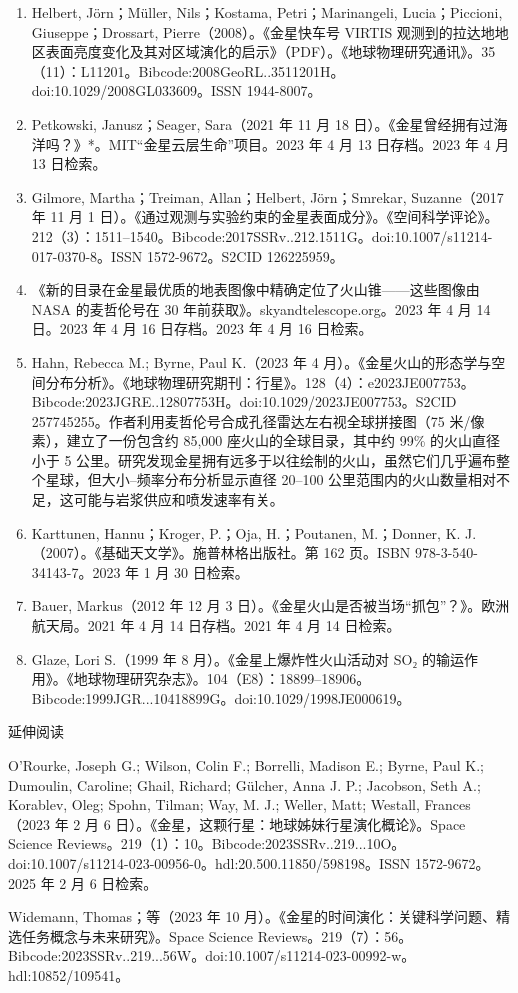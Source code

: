 \begin{enumerate}
\item Helbert, Jörn；Müller, Nils；Kostama, Petri；Marinangeli, Lucia；Piccioni, Giuseppe；Drossart, Pierre（2008）。《金星快车号 VIRTIS 观测到的拉达地地区表面亮度变化及其对区域演化的启示》（PDF）。《地球物理研究通讯》。35（11）：L11201。Bibcode:2008GeoRL..3511201H。doi:10.1029/2008GL033609。ISSN 1944-8007。
\item Petkowski, Janusz；Seager, Sara（2021 年 11 月 18 日）。《金星曾经拥有过海洋吗？》*。MIT“金星云层生命”项目。2023 年 4 月 13 日存档。2023 年 4 月 13 日检索。
\item Gilmore, Martha；Treiman, Allan；Helbert, Jörn；Smrekar, Suzanne（2017 年 11 月 1 日）。《通过观测与实验约束的金星表面成分》。《空间科学评论》。212（3）：1511–1540。Bibcode:2017SSRv..212.1511G。doi:10.1007/s11214-017-0370-8。ISSN 1572-9672。S2CID 126225959。
\item 《新的目录在金星最优质的地表图像中精确定位了火山锥——这些图像由 NASA 的麦哲伦号在 30 年前获取》。skyandtelescope.org。2023 年 4 月 14 日。2023 年 4 月 16 日存档。2023 年 4 月 16 日检索。

\item Hahn, Rebecca M.; Byrne, Paul K.（2023 年 4 月）。《金星火山的形态学与空间分布分析》。《地球物理研究期刊：行星》。128（4）：e2023JE007753。Bibcode:2023JGRE..12807753H。doi:10.1029/2023JE007753。S2CID 257745255。作者利用麦哲伦号合成孔径雷达左右视全球拼接图（75 米/像素），建立了一份包含约 85,000 座火山的全球目录，其中约 99\% 的火山直径小于 5 公里。研究发现金星拥有远多于以往绘制的火山，虽然它们几乎遍布整个星球，但大小–频率分布分析显示直径 20–100 公里范围内的火山数量相对不足，这可能与岩浆供应和喷发速率有关。
\item Karttunen, Hannu；Kroger, P.；Oja, H.；Poutanen, M.；Donner, K. J.（2007）。《基础天文学》。施普林格出版社。第 162 页。ISBN 978-3-540-34143-7。2023 年 1 月 30 日检索。
\item Bauer, Markus（2012 年 12 月 3 日）。《金星火山是否被当场“抓包”？》。欧洲航天局。2021 年 4 月 14 日存档。2021 年 4 月 14 日检索。
\item Glaze, Lori S.（1999 年 8 月）。《金星上爆炸性火山活动对 SO₂ 的输运作用》。《地球物理研究杂志》。104（E8）：18899–18906。Bibcode:1999JGR...10418899G。doi:10.1029/1998JE000619。


\end{enumerate}
延伸阅读

O'Rourke, Joseph G.; Wilson, Colin F.; Borrelli, Madison E.; Byrne, Paul K.; Dumoulin, Caroline; Ghail, Richard; Gülcher, Anna J. P.; Jacobson, Seth A.; Korablev, Oleg; Spohn, Tilman; Way, M. J.; Weller, Matt; Westall, Frances（2023 年 2 月 6 日）。《金星，这颗行星：地球姊妹行星演化概论》。Space Science Reviews。219（1）：10。Bibcode:2023SSRv..219...10O。doi:10.1007/s11214-023-00956-0。hdl:20.500.11850/598198。ISSN 1572-9672。2025 年 2 月 6 日检索。

Widemann, Thomas；等（2023 年 10 月）。《金星的时间演化：关键科学问题、精选任务概念与未来研究》。Space Science Reviews。219（7）：56。Bibcode:2023SSRv..219...56W。doi:10.1007/s11214-023-00992-w。hdl:10852/109541。
